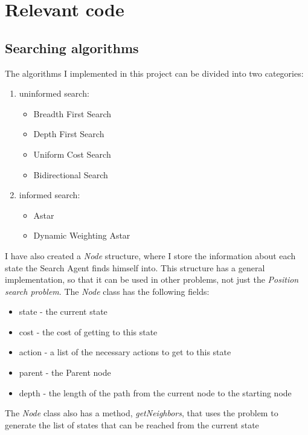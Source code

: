 \documentclass[a4paper,12pt]{report}
\begin{document}
\section{Relevant code}

\subsection{Searching algorithms}

The algorithms I implemented in this project can be divided into two categories:

\begin{enumerate}
	\item uninformed search:
		\begin{itemize}
			\item Breadth First Search
			\item Depth First Search
			\item Uniform Cost Search
			\item Bidirectional Search
		\end{itemize}
	\item informed search:
		\begin{itemize}
			\item Astar
			\item Dynamic Weighting Astar
		\end{itemize}
\end{enumerate}

I have also created a \textit{Node} structure, where I store the information about each state the Search Agent finds himself into. This structure has a general implementation, so that it can be used in other problems, not just the \textit{Position search problem}. The \textit{Node} class has the following fields:

\begin{itemize}
	\item state - the current state
	\item cost - the cost of getting to this state
	\item action - a list of the necessary actions to get to this state
	\item parent - the Parent node
	\item depth - the length of the path from the current node to the starting node
\end{itemize}

The \textit{Node} class also has a method, \textit{getNeighbors}, that uses the problem to generate the list of states that can be reached from the current state
\end{document}

